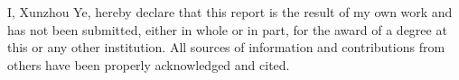 
I, Xunzhou Ye, hereby declare that this report is the result of my own work and
has not been submitted, either in whole or in part, for the award of a degree at
this or any other institution. All sources of information and contributions from
others have been properly acknowledged and cited.
